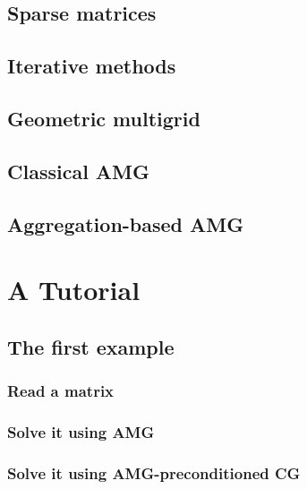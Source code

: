 \documentclass[11pt]{memoir}
\begin{document}
\section{Sparse matrices}

\section{Iterative methods}

\section{Geometric multigrid}

\section{Classical AMG}

\section{Aggregation-based AMG}

\chapter{A Tutorial}\label{ch:tutor}

\section{The first example}

\subsection{Read a matrix}

\subsection{Solve it using AMG}

\subsection{Solve it using AMG-preconditioned CG}
\end{document}
